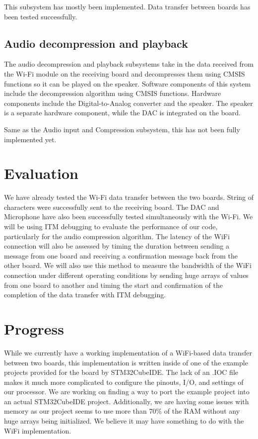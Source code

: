 \documentclass[journal]{IEEEtran}
\begin{document}
This subsystem has mostly been implemented. Data transfer between boards has been tested successfully. 

\subsection{Audio decompression and playback}

The audio decompression and playback subsystems take in the data received from the Wi-Fi module on the receiving board and decompresses them using CMSIS functions so it can be played on the speaker. Software components of this system include the decompression algorithm using CMSIS functions. Hardware components include the Digital-to-Analog converter and the speaker. The speaker is a separate hardware component, while the DAC is integrated on the board.

Same as the Audio input and Compression subsystem, this has not been fully implemented yet. 

\section{Evaluation}
We have already tested the Wi-Fi data transfer between the two boards. String of characters were successfully sent to the receiving board. The DAC and Microphone have also been successfully tested simultaneously with the Wi-Fi.
We will be using ITM debugging to evaluate the performance of our code, particularly for the audio compression algorithm. The latency of the WiFi connection will also be assessed by timing the duration between sending a message from one board and receiving a confirmation message back from the other board. We will also use this method to measure the bandwidth of the WiFi connection under different operating conditions by sending huge arrays of values from one board to another and timing the start and confirmation of the completion of the data transfer with ITM debugging.

\section{Progress}

While we currently have a working implementation of a WiFi-based data transfer between two boards, this implementation is written inside of one of the example projects provided for the board by STM32CubeIDE. The lack of an .IOC file makes it much more complicated to configure the pinouts, I/O, and settings of our processor. We are working on finding a way to port the example project into an actual STM32CubeIDE project. Additionally, we are having some issues with memory as our project seems to use more than 70\% of the RAM without any huge arrays being initialized. We believe it may have something to do with the WiFi implementation. 
\end{document}

